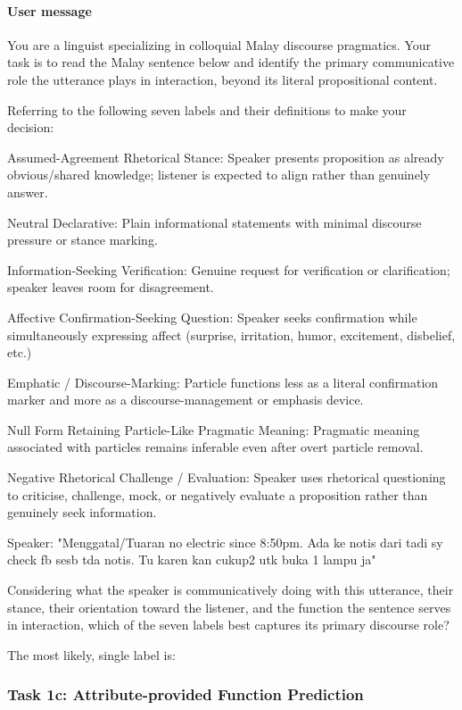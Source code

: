 \documentclass[11pt]{article}
\begin{document}
\paragraph{User message}
\begin{PromptBlock}
You are a linguist specializing in colloquial Malay discourse pragmatics. Your task is to read the Malay sentence below and identify the primary communicative role the utterance plays in interaction, beyond its literal propositional content.

Referring to the following seven labels and their definitions to make your decision:

Assumed-Agreement Rhetorical Stance: Speaker presents proposition as already obvious/shared knowledge; listener is expected to align rather than genuinely answer.

Neutral Declarative: Plain informational statements with minimal discourse pressure or stance marking.

Information-Seeking Verification: Genuine request for verification or clarification; speaker leaves room for disagreement.

Affective Confirmation-Seeking Question: Speaker seeks confirmation while simultaneously expressing affect (surprise, irritation, humor, excitement, disbelief, etc.)

Emphatic / Discourse-Marking: Particle functions less as a literal confirmation marker and more as a discourse-management or emphasis device.

Null Form Retaining Particle-Like Pragmatic Meaning: Pragmatic meaning associated with particles remains inferable even after overt particle removal.

Negative Rhetorical Challenge / Evaluation: Speaker uses rhetorical questioning to criticise, challenge, mock, or negatively evaluate a proposition rather than genuinely seek information.

Speaker: "Menggatal/Tuaran no electric since 8:50pm. Ada ke notis dari tadi sy check fb sesb tda notis. Tu karen kan cukup2 utk buka 1 lampu ja"

Considering what the speaker is communicatively doing with this utterance, their stance, their orientation toward the listener, and the function the sentence serves in interaction, which of the seven labels best captures its primary discourse role?

The most likely, single label is:
\end{PromptBlock}

\subsubsection{Task 1c: Attribute-provided Function Prediction}
\end{document}
